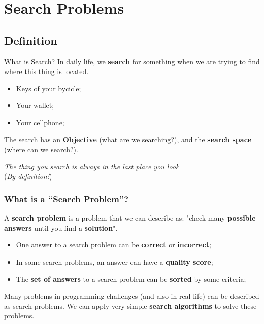 \section{Search Problems}

\subsection{Definition}
\begin{frame}{What is Search?}
  In daily life, we {\bf search} for something when we are trying to find where this thing is located.\medskip

  \begin{itemize}
  \item Keys of your bycicle;
  \item Your wallet;
  \item Your cellphone;
  \end{itemize}\medskip

  The search has an {\bf Objective} (what are we searching?), and the {\bf search space} (where can we search?).

  \begin{block}{}
    {\smaller
    \hfill \emph{The thing you search is always in the last place you look}\\
    \hfill (\emph{By definition!})}
  \end{block}
\end{frame}

\begin{frame}
  \frametitle{What is a ``Search Problem''?}
    A {\bf search problem} is a problem that we can describe as: "check many {\bf possible answers} until you find a {\bf solution}".\bigskip

    \begin{itemize}
      \item One answer to a search problem can be {\bf correct} or {\bf incorrect};\smallskip

      \item In some search problems, an answer can have a {\bf quality score};\smallskip

      \item The {\bf set of answers} to a search problem can be {\bf sorted} by some criteria;
    \end{itemize}
    \bigskip

    Many problems in programming challenges (and also in real life) can be described as search problems. We can apply very simple {\bf search algorithms} to solve these problems.
\end{frame}

